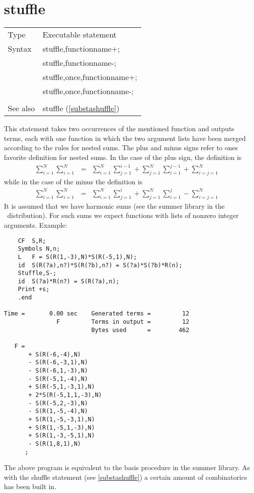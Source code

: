 %
\section{stuffle}
\label{substastuffle}

\noindent \begin{tabular}{ll}
Type & Executable statement\\
Syntax & stuffle,functionname+; \\
       & stuffle,functionname-; \\
       & stuffle,once,functionname+; \\
       & stuffle,once,functionname-; \\
\\ See also & stuffle (\ref{substashuffle})
\end{tabular} \vspace{4mm}

\noindent This statement 
takes two occurrences of the mentioned function and outputs 
terms, each with one function in which the two argument lists have been 
merged according to the rules for nested sums. The plus and minus signs 
refer to ones favorite definition for nested sums. In the case of the plus 
sign, the definition is
\begin{eqnarray}
    \sum_{i=1}^N \sum_{i=1}^N & = & \sum_{i=1}^N \sum_{j=1}^{i-1}
        + \sum_{j=1}^N \sum_{i=1}^{j-1}
        + \sum_{i=j=1}^N
\end{eqnarray}
while in the case of the minus the definition is
\begin{eqnarray}
    \sum_{i=1}^N \sum_{i=1}^N & = & \sum_{i=1}^N \sum_{j=1}^{i}
        + \sum_{j=1}^N \sum_{i=1}^{j}
        - \sum_{i=j=1}^N
\end{eqnarray}
It is assumed that we have harmonic sums (see the 
summer library in the \FORM\ distribution). For such sums we expect 
functions with lists of nonzero integer arguments. Example:
\begin{verbatim}
    CF  S,R;
    Symbols N,n;
    L   F = S(R(1,-3),N)*S(R(-5,1),N);
    id  S(R(?a),n?)*S(R(?b),n?) = S(?a)*S(?b)*R(n);
    Stuffle,S-;
    id  S(?a)*R(n?) = S(R(?a),n);
    Print +s;
    .end

Time =       0.00 sec    Generated terms =         12
               F         Terms in output =         12
                         Bytes used      =        462

   F =
       + S(R(-6,-4),N)
       - S(R(-6,-3,1),N)
       - S(R(-6,1,-3),N)
       - S(R(-5,1,-4),N)
       + S(R(-5,1,-3,1),N)
       + 2*S(R(-5,1,1,-3),N)
       - S(R(-5,2,-3),N)
       - S(R(1,-5,-4),N)
       + S(R(1,-5,-3,1),N)
       + S(R(1,-5,1,-3),N)
       + S(R(1,-3,-5,1),N)
       - S(R(1,8,1),N)
      ;
\end{verbatim}
The above program is equivalent to the basis procedure in the summer 
library. As with the shuffle statement (see 
\ref{substashuffle}) a certain amount of combinatorics has been built in.

